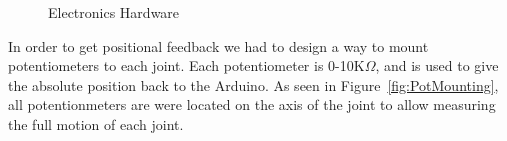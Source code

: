 \documentclass[paper=letter, fontsize=10pt]{scrartcl}	%
\numberwithin{equation}{section}															%
\numberwithin{figure}{section}																%
\numberwithin{table}{section}																%
\begin{document}
\begin{figure}[!h]
  \centering
   \quad
    \caption{Electronics Hardware}
    \label{fig:Hardware}
\end{figure}

In order to get positional feedback we had to design a way to mount potentiometers to each joint. Each potentiometer is 0-10K$\Omega$, and is used to give the absolute position back to the Arduino. As seen in Figure~\ref{fig:PotMounting}, all potentionmeters are were located on the axis of the joint to allow measuring the full motion of each joint.
\end{document}

